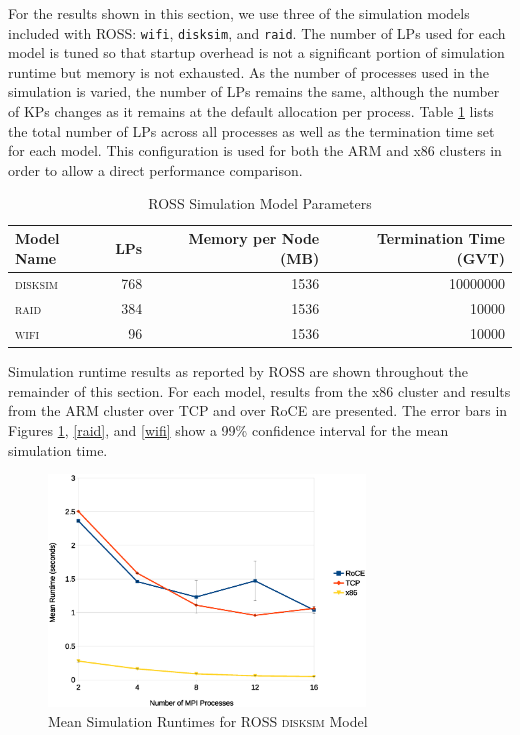 \documentclass[11pt]{book}
\begin{document}
For the results shown in this section, we use three of the simulation models included with
ROSS: \verb;wifi;, \verb;disksim;, and \verb;raid;.  The number of LPs used for each model
is tuned so that startup overhead is not a significant portion of simulation runtime but
memory is not exhausted.  As the number of processes used in the simulation is varied, the
number of LPs remains the same, although the number of KPs changes as it remains at the
default allocation per process.  Table \ref{lptable} lists the total number of LPs across
all processes as well as the termination time set for each model.  This configuration is
used for both the ARM and x86 clusters in order to allow a direct performance comparison.

\begin{table}
  \caption{ROSS Simulation Model Parameters}
  \label{lptable}
  \centering
  \begin{tabular}[c]{| l | r | r | r |}
    \hline
    Model Name & LPs & Memory per Node (MB) & Termination Time (GVT) \\ \hline
    \textsc{disksim} & 768 & 1536 & 10000000 \\
    \textsc{raid} & 384 & 1536 & 10000 \\
    \textsc{wifi} & 96 & 1536 & 10000 \\
    \hline
  \end{tabular}
\end{table}

Simulation runtime results as reported by ROSS are shown throughout the remainder of this
section.  For each model, results from the x86 cluster and results from the ARM cluster
over TCP and over RoCE are presented.  The error bars in Figures \ref{disksim},
\ref{raid}, and \ref{wifi} show a 99\% confidence interval for the mean simulation time.

\begin{figure}
\centering
\includegraphics[width=0.75\textwidth]{disksim}
\caption{Mean Simulation Runtimes for ROSS \textsc{disksim} Model}
\label{disksim}
\end{figure}
\end{document}
